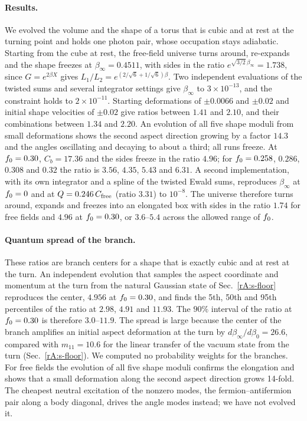 \paragraph{Results.}
We evolved the volume and the shape of a torus that is cubic and at rest at the turning point and holds one photon pair, whose occupation stays adiabatic.
Starting from the cube at rest, the free-field universe turns around, re-expands and the shape freezes at $\beta_\infty=0.4511$, with sides in the ratio $e^{\sqrt{3/2}\,\beta_\infty}=1.738$, since $G=e^{2\beta X}$ gives $L_1/L_2=e^{(2/\sqrt6+1/\sqrt6)\beta}$. %
Two independent evaluations of the twisted sums and several integrator settings give $\beta_\infty$ to $3\times10^{-13}$, and the constraint holds to $2\times10^{-11}$. %
Starting deformations of $\pm0.0066$ and $\pm0.02$ and initial shape velocities of $\pm0.02$ give ratios between $1.41$ and $2.10$, and their combinations between $1.34$ and $2.20$. %
An evolution of all five shape moduli from small deformations shows the second aspect direction growing by a factor $14.3$ and the angles oscillating and decaying to about a third; all runs freeze. %
At $f_0=0.30$, $C_b=17.36$ and the sides freeze in the ratio $4.96$; for $f_0=0.258$, $0.286$, $0.308$ and $0.32$ the ratio is $3.56$, $4.35$, $5.43$ and $6.31$. %
A second implementation, with its own integrator and a spline of the twisted Ewald sums, reproduces $\beta_\infty$ at $f_0=0$ and at $Q=0.246\,C_{\rm free}$ (ratio $3.31$) to $10^{-8}$. %
The universe therefore turns around, expands and freezes into an elongated box with sides in the ratio $1.74$ for free fields and $4.96$ at $f_0=0.30$, or $3.6$--$5.4$ across the allowed range of $f_0$. %

\paragraph{Quantum spread of the branch.}
These ratios are branch centers for a shape that is exactly cubic and at rest at the turn.
An independent evolution that samples the aspect coordinate and momentum at the turn from the natural Gaussian state of Sec.~\ref{rA:s-floor} reproduces the center, $4.956$ at $f_0=0.30$, and finds the 5th, 50th and 95th percentiles of the ratio at $2.98$, $4.91$ and $11.93$. %
The $90\%$ interval of the ratio at $f_0=0.30$ is therefore $3.0$--$11.9$.
The spread is large because the center of the branch amplifies an initial aspect deformation at the turn by $d\beta_\infty/d\beta_0=26.6$, compared with $m_{11}=10.6$ for the linear transfer of the vacuum state from the turn (Sec.~\ref{rA:s-floor}). %
We computed no probability weights for the branches.
For free fields the evolution of all five shape moduli confirms the elongation and shows that a small deformation along the second aspect direction grows 14-fold. %
The cheapest neutral excitation of the nonzero modes, the fermion--antifermion pair along a body diagonal, drives the angle modes instead; we have not evolved it. %

